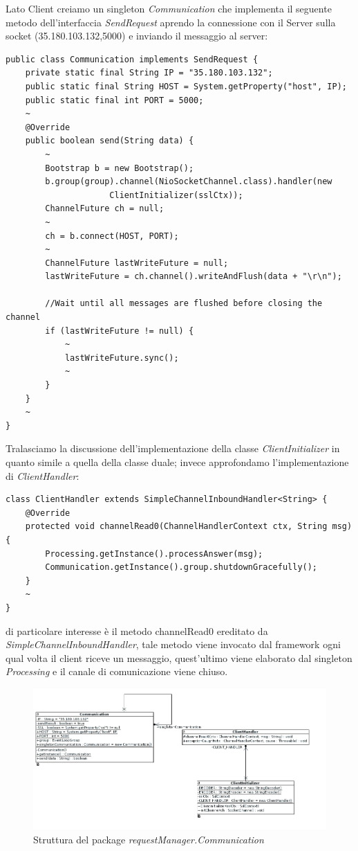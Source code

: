 \newpage
Lato Client creiamo un singleton \textit{Communication} che implementa il seguente metodo dell'interfaccia \textit{SendRequest} aprendo la connessione con il Server sulla socket (35.180.103.132,5000) e inviando il messaggio al server:
\begin{lstlisting}
public class Communication implements SendRequest {
	private static final String IP = "35.180.103.132";
	public static final String HOST = System.getProperty("host", IP);
	public static final int PORT = 5000;
	~
	@Override
	public boolean send(String data) {
		~
		Bootstrap b = new Bootstrap();
		b.group(group).channel(NioSocketChannel.class).handler(new
					 ClientInitializer(sslCtx));
		ChannelFuture ch = null;
		~
		ch = b.connect(HOST, PORT);
		~
		ChannelFuture lastWriteFuture = null;
		lastWriteFuture = ch.channel().writeAndFlush(data + "\r\n");
		
		//Wait until all messages are flushed before closing the channel
		if (lastWriteFuture != null) {
			~
			lastWriteFuture.sync();
			~
		}		
	}
	~
}
\end{lstlisting}
Tralasciamo la discussione dell'implementazione della classe \textit{ClientInitializer} in quanto simile a quella della classe duale; invece approfondamo l'implementazione di \textit{ClientHandler}: 
\begin{lstlisting}
class ClientHandler extends SimpleChannelInboundHandler<String> {
	@Override
	protected void channelRead0(ChannelHandlerContext ctx, String msg) {
		Processing.getInstance().processAnswer(msg);
		Communication.getInstance().group.shutdownGracefully();
	}
	~
}
\end{lstlisting}
di particolare interesse è il metodo channelRead0 ereditato da \textit{SimpleChannelInboundHandler}, tale metodo viene invocato dal framework ogni qual volta il client riceve un messaggio, quest'ultimo viene elaborato dal singleton \textit{Processing} e il canale di comunicazione viene chiuso.
\begin{figure}[h]
	\includegraphics[width=\textwidth]{Immagini/CommunicationPackageClient}
	\caption{Struttura del package \textit{requestManager.Communication}}
	\label{fig:xx}
\end{figure}







